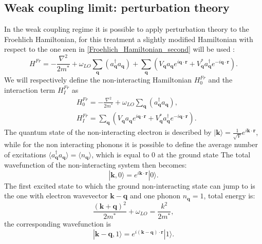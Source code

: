 \subsection{Weak coupling limit: perturbation theory}
In the weak coupling regime it is possible to apply perturbation theory to the Froehlich Hamiltonian, for this treatment a slightly modified 
Hamiltonian with respect to the one seen in \ref{Froehlich_Hamiltonian_second} will be used \cite{alexandrov2010advances}:
\begin{equation}
    H^{Fr}=-\frac{\nabla^2}{2m^*}+\omega_{LO}\sum_{\mathbf{q}}(a_\mathbf{q}^\dagger a_\mathbf{q})+\sum_{\mathbf{q}}(V_\mathbf{q}a_\mathbf{q}e^{i\mathbf{q}\cdot\mathbf{r}}+V^*_\mathbf{q}a^\dagger_\mathbf{q}e^{-i\mathbf{q}\cdot\mathbf{r}}).
\end{equation}
We will respectively define the non-interacting Hamiltonian $H_0^{Fr}$ and the interaction term $H_I^{Fr}$ as
\begin{equation}
\begin{split}
    &H_0^{Fr}=-\frac{\nabla^2}{2m^*}+\omega_{LO}\sum_{\mathbf{q}}(a_\mathbf{q}^\dagger a_\mathbf{q}),\\
    &H_I^{Fr}=\sum_{\mathbf{q}}(V_\mathbf{q}a_\mathbf{q}e^{i\mathbf{q}\cdot\mathbf{r}}+V^*_\mathbf{q}a^\dagger_\mathbf{q}e^{-i\mathbf{q}\cdot\mathbf{r}}).
\end{split}
\end{equation}
The quantum state of the non-interacting electron is described by $|\mathbf{k}\rangle=\frac{1}{\sqrt{V}}e^{i\mathbf{k}\cdot\mathbf{r}}$, 
while for the non interacting phonons it is possible to define the average number of excitations $\langle a^\dagger_\mathbf{q}a_\mathbf{q}\rangle=\langle n_\mathbf{q}\rangle$, 
which is equal to 0 at the ground state
The total wavefunction of the non-interacting system then becomes:
\begin{equation}
    |{\mathbf{k},0}\rangle=e^{i\mathbf{k}\cdot\mathbf{r}}|0\rangle.
\end{equation}
The first excited state to which the ground non-interacting state can jump to is the one with electron wavevector $\mathbf{k}-\mathbf{q}$ and 
one phonon $n_\mathbf{q}=1$, total energy is:
\begin{equation}
    \frac{(\mathbf{k}+\mathbf{q})^2}{2m^*}+\omega_{LO}=\frac{k^2}{2m^*},
\end{equation}
the corresponding wavefunction is
\begin{equation}
    |\mathbf{k}-\mathbf{q},1\rangle =e^{i(\mathbf{k}-\mathbf{q})\cdot \mathbf{r}}|1\rangle.
\end{equation}
